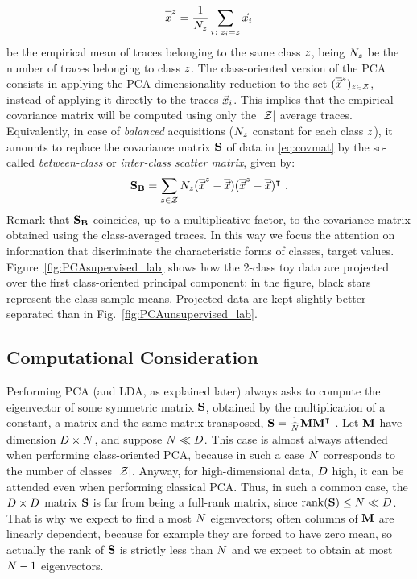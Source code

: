 $$\overline{\vec{x}}^{z} = \frac{1}{N_{z}}\sum_{i\colon z_i=z} \vec{x}_i$$ 
be the empirical mean of traces belonging to the same class $z$, being $N_{z}$ be the number of traces belonging to class $z$. The class-oriented version of the PCA  consists in applying the PCA dimensionality reduction to the set $(\overline{\vec{x}}^{z})_{z \in \mathcal{Z}}$, instead of applying it directly to the traces $\vec{x}_i$. This implies that the empirical covariance matrix will be computed using only the $\lvert\mathcal{Z}\rvert$ average traces. Equivalently, in case of \textit{balanced} acquisitions ($N_{z}$ constant for each class $z$), it amounts to replace the covariance matrix $\textbf{S}$ of data in \eqref{eq:covmat}  by the so-called {\em between-class} or  {\em inter-class scatter matrix}, given by:
\begin{equation}\label{eq:SB}
\textbf{S}_{\textbf{B}} = \sum_{z\in\mathcal{Z}}N_{z}(\overline{\vec{x}}^{z}-\overline{\vec{x}})(\overline{\vec{x}}^{z}-\overline{\vec{x}})^\intercal \mbox{ .}
\end{equation}
Remark that $\textbf{S}_{\textbf{B}}$ coincides, up to a multiplicative factor, to the covariance matrix obtained using the class-averaged traces. In this way we focus the attention on information that discriminate the characteristic forms of classes, \ie target values. Figure~\ref{fig:PCAsupervised_lab} shows how the 2-class toy data are projected over the first class-oriented principal component: in the figure, black stars represent the class sample means. Projected data are kept slightly better separated than in Fig.~\ref{fig:PCAunsupervised_lab}.



\subsection{Computational Consideration}\label{sec:trick}
Performing PCA (and LDA, as explained later) always asks to compute the eigenvector of some symmetric matrix $\textbf{S}$, obtained by the multiplication of a constant, a matrix and the same matrix transposed, \eg $\textbf{S} = \frac{1}{N}\textbf{M}\textbf{M}^\intercal$ . Let $\textbf{M}$ have dimension $D\times N$, and suppose $N\ll D$. This case is almost always attended when performing class-oriented PCA, because in such a case $N$ corresponds to the number of classes $\lvert\mathcal{Z}\rvert$. Anyway, for high-dimensional data, \ie $D$ high, it can be attended even when performing classical PCA. Thus, in such a common case, the $D\times D$ matrix $\textbf{S}$ is far from being a full-rank matrix, since $\mathrm{rank}(\textbf{S})\leq N\ll D$. That is why we expect to find a most $N$ eigenvectors; often columns of $\textbf{M}$ are linearly dependent, because for example they are forced to have zero mean, so actually the rank of $\textbf{S}$ is strictly less than $N$ and we expect to obtain at most $N-1$ eigenvectors.

